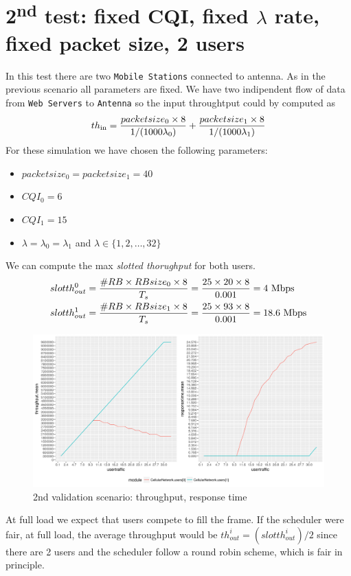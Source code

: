 \section{2\textsuperscript{nd} test: fixed CQI, fixed \(\lambda\) rate, fixed packet size, 2 users}
In this test there are two \texttt{Mobile Stations} connected to antenna. As in the previous scenario all parameters are fixed. We have two indipendent flow of data from \texttt{Web Servers} to \texttt{Antenna} so the input throughtput could by computed as
\begin{equation} 
th\textsubscript{in} = \frac{packetsize\textsubscript{0} \times 8}{1/(1000\lambda\textsubscript{0})} + \frac{packetsize\textsubscript{1} \times 8}{1/(1000\lambda\textsubscript{1})}
\end{equation}
For these simulation we have chosen the following parameters:
\begin{itemize}
	\item \(packetsize_{0} = packetsize_{1} = 40\)
	\item \(CQI_{0} = 6\)
	\item \(CQI_{1} = 15\)
	\item \(\lambda = \lambda_{0} = \lambda_{1}\) and \(\lambda \in \{1,2,\ldots,32\}\)
\end{itemize}
We can compute the max \textit{slotted thorughput} for both users.
\begin{equation}
	\begin{split}
	slotth^{0}_{out} &= \frac{\#RB \times RBsize_{0} \times 8 }{T_s} = \frac{25 \times 20 \times 8}{0.001} = 4 \textnormal{ Mbps} \\ 
	slotth^{1}_{out} &= \frac{\#RB \times RBsize_{1} \times 8 }{T_s} = \frac{25 \times 93 \times 8}{0.001} = 18.6 \textnormal{ Mbps}
	\end{split}
\end{equation} 
\begin{figure}[H]
  \includegraphics[width=1\textwidth]{images/all-val2}
  \caption{2nd validation scenario: throughput, response time}
  \label{fig:2nd validation scenario: throughput, response time}
\end{figure}
At full load we expect that users compete to fill the frame. If the scheduler were fair, at full load, the average throughput would be \(th^{i}_{out} = (slotth^{i}_{out})/2\) since there are 2 users and the scheduler follow a round robin scheme, which is fair in principle. 

